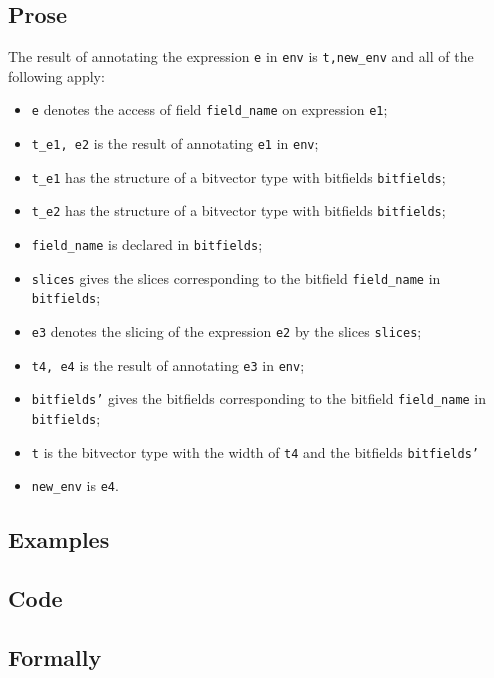 \documentclass{book}
\begin{document}
  \subsection{Prose}
  The result of annotating the expression \texttt{e} in \texttt{env} is
\texttt{t,new\_env} and all of the following apply:
  \begin{itemize}
  \item \texttt{e} denotes the access of field \texttt{field\_name} on expression \texttt{e1};
  \item \texttt{t\_e1, e2} is the result of annotating \texttt{e1} in \texttt{env};
  \item \texttt{t\_e1} has the structure of a bitvector type with bitfields \texttt{bitfields};
  \item \texttt{t\_e2} has the structure of a bitvector type with bitfields \texttt{bitfields};
  \item \texttt{field\_name} is declared in \texttt{bitfields};
  \item \texttt{slices} gives the slices corresponding to the bitfield \texttt{field\_name} in
    \texttt{bitfields};
  \item \texttt{e3} denotes the slicing of the expression \texttt{e2} by the slices \texttt{slices};
  \item \texttt{t4, e4} is the result of annotating \texttt{e3} in \texttt{env};
  \item \texttt{bitfields'} gives the bitfields corresponding to the bitfield \texttt{field\_name}
    in \texttt{bitfields};
  \item \texttt{t} is the bitvector type with the width of \texttt{t4} and the bitfields \texttt{bitfields'}
  \item \texttt{new\_env} is \texttt{e4}.
  \end{itemize}

  \subsection{Examples}

  \subsection{Code}

  \subsection{Formally}
\end{document}
